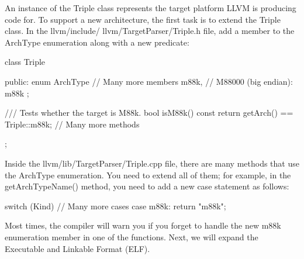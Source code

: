 An instance of the Triple class represents the target platform LLVM is producing code for. To support a new architecture, the first task is to extend the Triple class. In the llvm/include/ llvm/TargetParser/Triple.h file, add a member to the ArchType enumeration along with a new predicate:

\begin{cpp}
class Triple {
public:
    enum ArchType {
        // Many more members
        m88k, // M88000 (big endian): m88k
    };

    /// Tests whether the target is M88k.
    bool isM88k() const {
        return getArch() == Triple::m88k;
    }
    // Many more methods
};
\end{cpp}

Inside the llvm/lib/TargetParser/Triple.cpp file, there are many methods that use the ArchType enumeration. You need to extend all of them; for example, in the getArchTypeName() method, you need to add a new case statement as follows:

\begin{cpp}
switch (Kind) {
    // Many more cases
    case m88k: return "m88k";
}
\end{cpp}

Most times, the compiler will warn you if you forget to handle the new m88k enumeration member in one of the functions. Next, we will expand the Executable and Linkable Format (ELF).

































